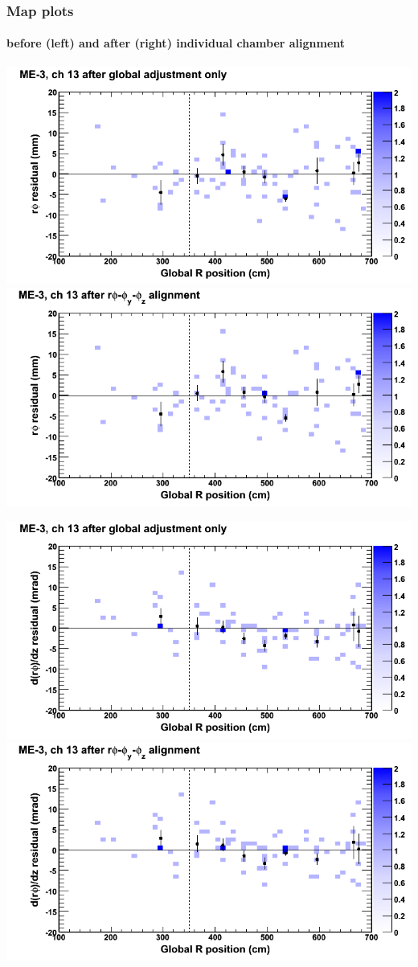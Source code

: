 \documentclass[compress]{beamer}
\begin{document}
\begin{frame}
\frametitle{Map plots}
\framesubtitle{before (left) and after (right) individual chamber alignment}
\includegraphics[width=0.5\linewidth]{ringmapplots_3dof/before_CSCvsr_mem3ch13_x.png} \includegraphics[width=0.5\linewidth]{ringmapplots_3dof/after_CSCvsr_mem3ch13_x.png}

\includegraphics[width=0.5\linewidth]{ringmapplots_3dof/before_CSCvsr_mem3ch13_dxdz.png} \includegraphics[width=0.5\linewidth]{ringmapplots_3dof/after_CSCvsr_mem3ch13_dxdz.png}
\end{frame}
\end{document}
